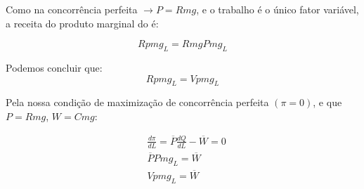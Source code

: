\documentclass[12pt,a4paper,oneside,brazil]{abntex2}
\begin{document}
Como na concorrência perfeita $\rightarrow P = Rmg$, e o trabalho é o único fator variável, a receita do produto marginal do é:

\begin{equation} \label{rpmg}
	Rpmg_L = Rmg Pmg_L
\end{equation}

Podemos concluir que:
\begin{equation}
	Rpmg_L = Vpmg_L
\end{equation}

Pela nossa condição de maximização de concorrência perfeita $(\pi = 0)$, e que $P = Rmg$, $W = Cmg$:

\begin{align} \label{eq_mf}
&	\frac{d \pi}{d L} = \overline{P} \frac{d Q}{d L} - \overline{W} = 0 \\ 
&  \overline{P} Pmg_L = \overline{W} \\
&  Vpmg_L = \overline{W}
\end{align}

\printbibliography
\end{document}
